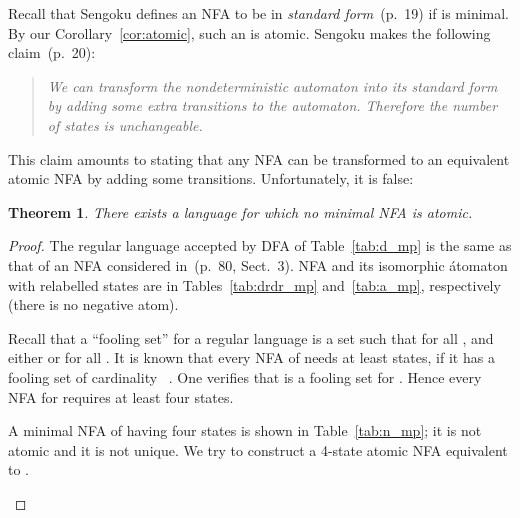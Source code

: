 \documentclass[preprint,12pt]{elsarticle}
\newtheorem{theorem}{Theorem}
\begin{document}
Recall that Sengoku 
defines an NFA  to be in \emph{standard form}~\cite{Sen92}(p.~19) 
if  is minimal.
By our Corollary~\ref{cor:atomic}, such an  is atomic.
Sengoku makes the following claim~\cite{Sen92}(p.~20):
\begin{quote}
\vskip-0.1cm
\emph{We can transform the nondeterministic automaton into its standard form 
by adding some extra transitions to the automaton. Therefore the number of 
states is unchangeable.}
\end{quote}
\vskip-0.1cm
This claim amounts to stating that any NFA can be transformed to an equivalent  
atomic NFA by adding some transitions. Unfortunately, it is false:
\begin{theorem}
\label{thm:Sengoku}
There exists a language for which no minimal NFA is atomic.
\end{theorem}
\begin{proof}
\vskip-0.1cm
The regular language  accepted by DFA  of Table~\ref{tab:d_mp}  
is the same as that of an NFA considered in~\cite{MaPo95}(p.~80, Sect.~3). 
NFA  and its isomorphic \'atomaton  
with relabelled states are in Tables~\ref{tab:drdr_mp} and~\ref{tab:a_mp}, 
respectively (there is no negative atom). 

Recall that a ``fooling set'' for a regular language  is a set  such that  for all , and either  or  for all . It is known that every NFA of  needs at least  states, if it has a fooling set of cardinality ~\cite{Bir92}.
One verifies that  is a fooling set for . 
Hence every NFA for  requires at least four states.

A minimal NFA  of  having four states is shown in 
Table~\ref{tab:n_mp}; it is not atomic and it is not unique. 
We try to construct a 4-state atomic NFA  equivalent to . 
\begin{table}[hbt]
\begin{minipage}[b]{0.19\linewidth}
\caption{.}
\label{tab:d_mp}
{\footnotesize
\begin{center}

\end{center}}
\end{minipage}
\hspace{0.03cm}
\begin{minipage}[b]{0.38\linewidth}
\caption{.}
\label{tab:drdr_mp}
{\footnotesize
\begin{center}

\end{center}}
\end{minipage}
\hspace{0.83cm}
\begin{minipage}[b]{0.32\linewidth}
\caption{ .}
\label{tab:a_mp}
{\footnotesize
\begin{center}


\end{center}}
\end{minipage}
\end{table}
\end{proof}
\end{document}
